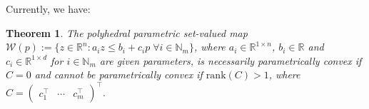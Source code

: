 \documentclass[a4paper]{scrartcl}
\providecommand{\rank}{\text{rank}}
\newtheorem{theorem}{Theorem}
\begin{document}
Currently, we have:

\begin{theorem}\label{thm:polytopic:set:not:p:convex}
  The polyhedral parametric set-valued map $\mathcal W(p):=\{z\in \mathbb R^n : a_i z \leq b_i  + c_i p \; \forall i\in\mathbb N_m\}$, 
  where $a_i\in\mathbb R^{1\times n}$, $b_i \in \mathbb R$ and $c_i \in \mathbb R^{1\times d}$ for 
  $i\in\mathbb N_m$ are given parameters, is necessarily parametrically convex if $C=0$ and cannot 
  be parametrically convex if $\rank( C ) > 1$, where 
  $C = (\begin{matrix} c_1^\top & \cdots & c_m^\top\end{matrix})^\top.$
\end{theorem}
\end{document}
